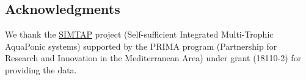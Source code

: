 \subsection{Acknowledgments}\label{acknowledgments}

We thank the \href{https://www.simtap.eu}{SIMTAP} project (Self-sufficient Integrated Multi-Trophic AquaPonic systems) supported by the PRIMA program (Partnership for Research and Innovation in the Mediterranean Area) under grant (18110-2) for providing the data.



\address{%
Gilles Durrieu\\
Univ Bretagne Sud, LMBA CNRS UMR 6205\\%
F-56000 Vannes, France\\
%
%
\textit{ORCiD: \href{https://orcid.org/0000-0003-0375-912X}{0000-0003-0375-912X}}\\%
\href{mailto:gilles.durrieu@univ-ubs.fr}{\nolinkurl{gilles.durrieu@univ-ubs.fr}}%
}

\address{%
Thomas Fillon\\
Univ Bretagne Sud, LMBA CNRS UMR 6205 \& IRISA CNRS UMR 6074\\%
F-56000 Vannes, France\\
%
%
\textit{ORCiD: \href{https://orcid.org/0000-0003-1207-8414}{0000-0003-1207-8414}}\\%
\href{mailto:thoma.fillon@univ-ubs.fr}{\nolinkurl{thoma.fillon@univ-ubs.fr}}%
}

\address{%
Tristan Senga Kiessé\\
INRAE, Institut Agro \& UMR 1069 SAS\\%
F-35000 Rennes, France\\
%
%
\textit{ORCiD: \href{https://orcid.org/0000-0003-2710-5825}{0000-0003-2710-5825}}\\%
\href{mailto:tristan.senga-kiesse@inrae.fr}{\nolinkurl{tristan.senga-kiesse@inrae.fr}}%
}
